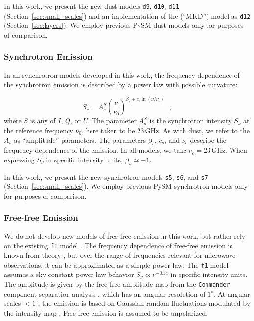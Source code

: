 \documentclass[twocolumn]{aastex631}
\begin{document}
In this work, we present the new dust models \texttt{d9}, \texttt{d10}, \texttt{d11} (Section~\ref{sec:small_scales}) and an implementation of the \citet{Martinez-Solaeche:2018} (``MKD'') model as \texttt{d12} (Section~\ref{sec:layers}). We employ previous PySM dust models only for purposes of comparison.

\subsubsection{Synchrotron Emission} \label{subsubsec:synch_model}
In all synchrotron models developed in this work, the frequency dependence of the synchrotron emission is described by a power law with possible curvature:

\begin{equation} \label{eq:synch-emission-law}
    S_\nu = A_s^S \left(\frac{\nu}{\nu_0}\right)^{\beta_s + c_s \ln\left(\nu/\nu_c\right)}
    ~~~,
\end{equation}
where $S$ is any of $I$, $Q$, or $U$. The parameter $A_s^S$ is the synchrotron intensity $S_\nu$ at the reference frequency $\nu_0$, here taken to be 23\,GHz. As with dust, we refer to the $A_s$ as ``amplitude'' parameters. The parameters $\beta_s$, $c_s$, and $\nu_c$ describe the frequency dependence of the emission. In all models, we take $\nu_c = 23$\,GHz. When expressing $S_\nu$ in specific intensity units, $\beta_s \simeq -1$.

In this work, we present the new synchrotron models \texttt{s5}, \texttt{s6}, and \texttt{s7} (Section~\ref{sec:small_scales}). We employ previous PySM synchrotron models only for purposes of comparison.

\subsubsection{Free-free Emission}
We do not develop new models of free-free emission in this work, but rather rely on the existing \texttt{f1} model \citep{Thorne:2017}. The frequency dependence of free-free emission is known from theory \citep[][and references therein]{Draine:2011}, but over the range of frequencies relevant for microwave observations, it can be approximated as a simple power law. The \texttt{f1} model assumes a sky-constant power-law behavior $S_\nu \propto \nu^{-0.14}$ in specific intensity units. The amplitude is given by the free-free amplitude map from the \texttt{Commander} component separation analysis \citep{planck2014-a12}, which has an angular resolution of $1^\circ$. At angular scales $<1^\circ$, the emission is based on Gaussian random fluctuations modulated by the intensity map \citep[see][for details]{Thorne:2017}. Free-free emission is assumed to be unpolarized.
\end{document}
